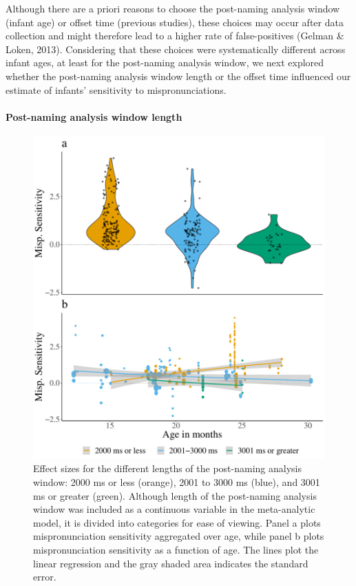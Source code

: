 \documentclass[man]{apa6}
\let\oldparagraph\paragraph
\renewcommand{\paragraph}[1]{\oldparagraph{#1}\mbox{}}
\begin{document}
Although there are a priori reasons to choose the post-naming analysis window (infant age) or offset time (previous studies), these choices may occur after data collection and might therefore lead to a higher rate of false-positives (Gelman \& Loken, 2013). Considering that these choices were systematically different across infant ages, at least for the post-naming analysis window, we next explored whether the post-naming analysis window length or the offset time influenced our estimate of infants' sensitivity to mispronunciations.

\hypertarget{post-naming-analysis-window-length}{%
\paragraph{Post-naming analysis window length}\label{post-naming-analysis-window-length}}

\begin{figure}
\centering
\includegraphics{VonHolzenBergmann_MPMetaAnalysis_files/figure-latex/Plot-post-name-cond-age-1.pdf}
\caption{\label{fig:Plot-post-name-cond-age}Effect sizes for the different lengths of the post-naming analysis window: 2000 ms or less (orange), 2001 to 3000 ms (blue), and 3001 ms or greater (green). Although length of the post-naming analysis window was included as a continuous variable in the meta-analytic model, it is divided into categories for ease of viewing. Panel a plots mispronunciation sensitivity aggregated over age, while panel b plots mispronunciation sensitivity as a function of age. The lines plot the linear regression and the gray shaded area indicates the standard error.}
\end{figure}
\end{document}
